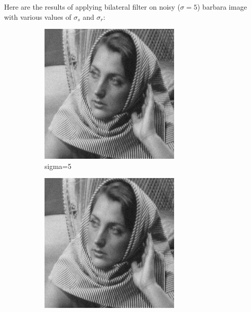 \documentclass[12pt]{article}
\begin{document}
Here are the results of applying bilateral filter on noisy ($\sigma = 5$) barbara image with various values of $\sigma_s$ and $\sigma_r$:

\begin{figure}[h]
    \centering
    \begin{subfigure}[b]{0.24\textwidth}
        \centering
        \includegraphics[width=\textwidth]{../images/noisy_barbara256.png}
        \caption{sigma=5}
        \label{Noisy (sigma=5)}
    \end{subfigure}
    \begin{subfigure}[b]{0.24\textwidth}
        \centering
        \includegraphics[width=\textwidth]{../images/filtered_barbara256_bilateral_sigma_s_2_sigma_r_2.png}

\end{subfigure}
\end{figure}
\end{document}
